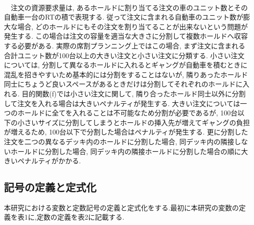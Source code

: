 \documentclass[a4j,11pt,twocolumn]{jsarticle}
\begin{document}
 \\
　注文の資源要求量は, あるホールドに割り当てる注文の車のユニット数とその自動車一台のRTの積で表現する. 従って注文に含まれる自動車のユニット数が膨大な場合, どのホールドにもその注文を割り当てることが出来ないという問題が発生する. この場合は注文の容量を適当な大きさに分割して複数ホールドへ収容する必要がある. 実際の席割プランニング上ではこの場合, まず注文に含まれる合計ユニット数が100台以上の大きい注文と小さい注文に分類する. 小さい注文については, 分割して異なるホールドに入れるとギャングが自動車を積むときに混乱を招きやすいため基本的には分割をすることはないが, 隣りあったホールド同士にちょうど良いスペースがあるときだけは分割してそれぞれのホールドに入れる. 目的関数(f)では小さい注文に関して, 隣り合ったホールド同士以外に分割して注文を入れる場合は大きいペナルティが発生する. 大きい注文については一つのホールドに全てを入れることは不可能なため分割が必要であるが,  100台以下の小さいサイズに分割してしまうとホールドの挿入先が増えてギャングの負担が増えるため, 100台以下で分割した場合はペナルティが発生する. 更に分割した注文を二つの異なるデッキ内のホールドに分割した場合, 同デッキ内の隣接しないホールドに分割した場合, 同デッキ内の隣接ホールドに分割した場合の順に大きいペナルティがかかる. \\


\subsection{記号の定義と定式化}
本研究における変数と定数記号の定義と定式化をする.最初に本研究の変数の定義を表1に,定数の定義を表2に記載する.

\clearpage
\end{document}
